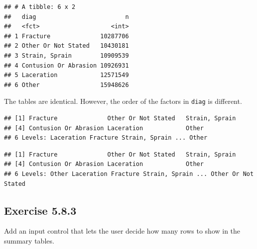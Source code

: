 \documentclass[]{book}
\newenvironment{Shaded}{\begin{snugshade}}{\end{snugshade}}
\newcommand{\NormalTok}[1]{#1}
\newcommand{\OperatorTok}[1]{\textcolor[rgb]{0.81,0.36,0.00}{\textbf{#1}}}
\begin{document}
\begin{solution}
\begin{Shaded}
\begin{Highlighting}[]
{{{{\NormalTok{table2}
\end{Highlighting}
\end{Shaded}

\begin{verbatim}
## # A tibble: 6 x 2
##   diag                         n
##   <fct>                    <int>
## 1 Fracture              10287706
## 2 Other Or Not Stated   10430181
## 3 Strain, Sprain        10909539
## 4 Contusion Or Abrasion 10926931
## 5 Laceration            12571549
## 6 Other                 15948626
\end{verbatim}

The tables are identical. However, the order of the factors in \texttt{diag} is
different.

\begin{Shaded}
\end{Shaded}

\begin{verbatim}
## [1] Fracture              Other Or Not Stated   Strain, Sprain       
## [4] Contusion Or Abrasion Laceration            Other                
## 6 Levels: Laceration Fracture Strain, Sprain ... Other
\end{verbatim}

\begin{Shaded}
\end{Shaded}

\begin{verbatim}
## [1] Fracture              Other Or Not Stated   Strain, Sprain       
## [4] Contusion Or Abrasion Laceration            Other                
## 6 Levels: Other Laceration Fracture Strain, Sprain ... Other Or Not Stated
\end{verbatim}

\end{solution}

\hypertarget{exercise-5.8.3}{%
\subsection*{Exercise 5.8.3}\label{exercise-5.8.3}}

Add an input control that lets the user decide how many rows to show in the
summary tables.
\end{document}
